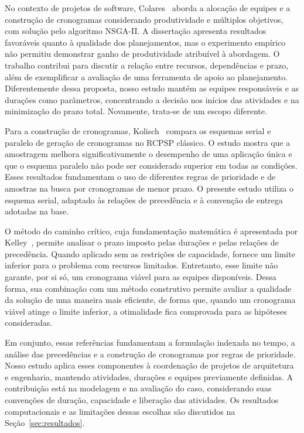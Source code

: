 No contexto de projetos de software, Colares~\cite{colares2010} aborda a
alocação de equipes e a construção de cronogramas considerando produtividade
e múltiplos objetivos, com solução pelo algoritmo NSGA-II. A dissertação
apresenta resultados favoráveis quanto à qualidade dos planejamentos, mas
o experimento empírico não permitiu demonstrar ganho de produtividade
atribuível à abordagem. O trabalho contribui para discutir a relação entre
recursos, dependências e prazo, além de exemplificar a avaliação de uma
ferramenta de apoio ao planejamento. Diferentemente dessa proposta, nosso
estudo mantém as equipes responsáveis e as durações como parâmetros,
concentrando a decisão nos inícios das atividades e na minimização do prazo
total. Novamente, trata-se de um escopo diferente.

Para a construção de cronogramas, Kolisch~\cite{kolisch1996} compara os
esquemas serial e paralelo de geração de cronogramas no RCPSP clássico. O
estudo mostra que a amostragem melhora significativamente o desempenho de
uma aplicação única e que o esquema paralelo não pode ser considerado
superior em todas as condições. Esses resultados fundamentam o uso de
diferentes regras de prioridade e de amostras na busca por cronogramas de
menor prazo. O presente estudo utiliza o esquema serial, adaptado às
relações de precedência e à convenção de entrega adotadas na base.

O método do caminho crítico, cuja fundamentação matemática é apresentada
por Kelley~\cite{kelley1961}, permite analisar o prazo imposto pelas
durações e pelas relações de precedência. Quando aplicado sem as
restrições de capacidade, fornece um limite inferior para o problema com
recursos limitados. Entretanto, esse limite não garante, por si só, um cronograma
viável para as equipes disponíveis. Dessa forma, sua combinação com um método
construtivo permite avaliar a qualidade da solução de uma maneira mais eficiente, de forma que, quando um cronograma
viável atinge o limite inferior, a otimalidade fica comprovada para as
hipóteses consideradas.

Em conjunto, essas referências fundamentam a formulação indexada no tempo,
a análise das precedências e a construção de cronogramas por regras de
prioridade. Nosso estudo aplica esses componentes à coordenação de projetos
de arquitetura e engenharia, mantendo atividades, durações e equipes
previamente definidas. A contribuição está na modelagem e na avaliação do
caso, considerando suas convenções de duração, capacidade e liberação das
atividades. Os resultados computacionais e as limitações dessas escolhas
são discutidos na Seção~\ref{sec:resultados}.
